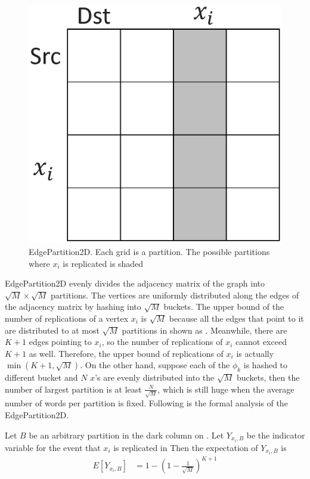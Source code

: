 \begin{figure}[h]
	\centering
	\includegraphics[scale=0.25]{figs/2dhash.eps}
	\caption{EdgePartition2D. Each grid is a partition. 
	The possible partitions where $x_i$ is
	replicated is shaded}
	\label{fig:2dhash}
\end{figure}

EdgePartition2D evenly divides the adjacency matrix of the graph into $\sqrt{M}
\times \sqrt{M}$ partitions. The vertices are uniformly distributed along the
edges of the adjacency matrix by hashing into $\sqrt{M}$ buckets. The upper
bound of the number of replications of a vertex $x_i$ is $\sqrt{M}$ because all
the edges that point to it are distributed to at most $\sqrt{M}$ partitions
in shown as .  Meanwhile, there are $K+1$
edges pointing to $x_i$, so the number of replications of $x_i$ cannot exceed
$K+1$ as well. Therefore, the upper bound of replications of $x_i$ is actually
$\min(K+1, \sqrt{M})$. On the other hand, suppose each of the $\phi_k$ is
hashed to different bucket and $N$ $x$'s are evenly distributed into the
$\sqrt{M}$ buckets, then the number of largest partition is at least
$\frac{N}{\sqrt{M}}$, which is still huge when the average number of words per
partition is fixed. Following is the formal analysis of the EdgePartition2D.

Let $B$ be an arbitrary
partition in the dark column on .
Let $Y_{x_i, B}$ be the indicator variable for the event that $x_i$ is replicated in 
Then the expectation of $Y_{x_i, B}$ is
\begin{align*}
	E[Y_{x_i, B}] &= 1 - (1 - \frac{1}{\sqrt{M}})^{K+1} \\
\end{align*}

